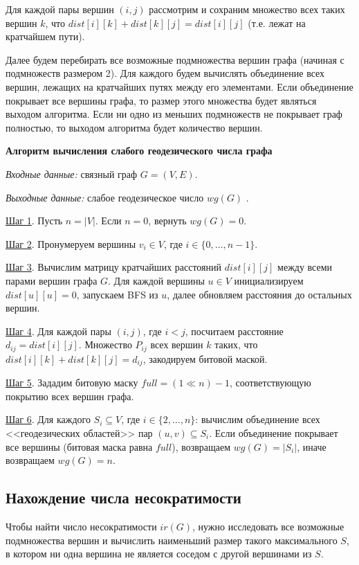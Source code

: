 \documentclass[bachelor, och, nir]{SCWorks}
\begin{document}
Для каждой пары вершин $(i, j)$ рассмотрим и сохраним множество всех таких вершин $k$, что $dist[i][k] + dist[k][j] = dist[i][j]$ (т.е. лежат на кратчайшем пути). 

Далее будем перебирать все возможные подмножества вершин графа (начиная с подмножеств размером 2). Для каждого будем вычислять объединение всех вершин, лежащих на кратчайших путях между его элементами. Если объединение покрывает все вершины графа, то размер этого множества будет являться выходом алгоритма. Если ни одно из меньших подмножеств не покрывает граф полностью, то выходом алгоритма будет количество вершин.
\vspace{1em}

\textbf{Алгоритм вычисления слабого геодезического числа графа}

\textit{Входные данные:} связный граф $G = (V, E)$.

\textit{Выходные данные:} слабое геодезическое число $wg(G)$ .

\underline{Шаг 1}. Пусть $n = |V|$. Если $n = 0$, вернуть $wg(G) = 0$.

\underline{Шаг 2}. Пронумеруем вершины $v_i \in V$, где $i \in \{0, \dots, n-1\}$.

\underline{Шаг 3}. Вычислим матрицу кратчайших расстояний $dist[i][j]$ между всеми 
  парами вершин графа $G$. Для каждой вершины $u \in V$ инициализируем $dist[u][u] = 0$, запускаем BFS из $u$, далее обновляем расстояния до остальных вершин.
  
\underline{Шаг 4}. Для каждой пары $(i,j)$, где $i < j$, посчитаем расстояние $d_{ij} = dist[i][j]$. Множество $P_{ij}$ всех вершин $k$ таких, что $dist[i][k] + dist[k][j] = d_{ij}$, закодируем битовой маской.
  
\underline{Шаг 5}. Зададим битовую маску $full = (1 \ll n) - 1$, соответствующую покрытию всех вершин графа.

\underline{Шаг 6}. Для каждого  $S_i \subseteq V$, где $ i \in \{2, \dots, n\}$:
 вычислим объединение всех <<геодезических областей>> пар $(u,v) \subseteq S_i$. Если объединение покрывает все вершины (битовая маска равна $full$), возвращаем $wg(G) = |S_i|$, иначе возвращаем $wg(G) = n$.

\subsection{Нахождение числа несократимости}

Чтобы найти число несократимости $ir(G)$, нужно исследовать все возможные подмножества вершин и вычислить наименьший размер такого максимального $S$, в котором ни одна вершина не является соседом с другой вершинами из $S$. 
\end{document}
